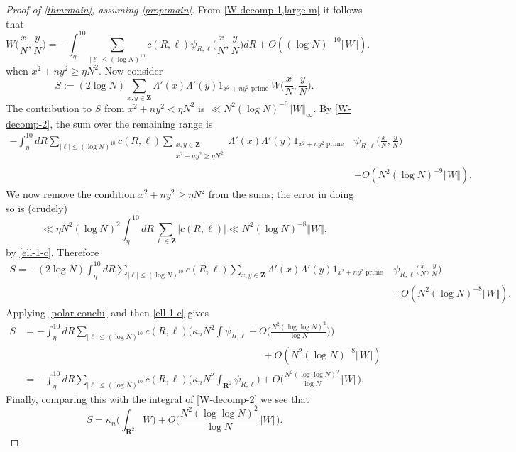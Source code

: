 \documentclass[11pt,reqno]{amsart}
\numberwithin{equation}{section}
\theoremstyle{definition}
\theoremstyle{remark}
\renewcommand{\le}{\leqslant}
\renewcommand{\ge}{\geqslant}
\newcommand\Z{\mathbf{Z}}
\newcommand\R{\mathbf{R}}
\begin{document}
\begin{proof}[Proof of \cref{thm:main}, assuming \cref{prop:main}]
From \cref{W-decomp-1,large-m} it follows that
\begin{equation}\label{W-decomp-2} W\Big(\frac{x}{N}, \frac{y}{N}\Big) = -\int^{10}_{\eta} \sum_{|\ell| \le (\log N)^{10}} c(R,\ell) \psi_{R,\ell}\Big(\frac{x}{N}, \frac{y}{N}\Big) dR + O((\log N)^{-10} \Vert  W \Vert). \end{equation}
when $x^2 + ny^2 \ge \eta N^2$. Now consider
\begin{equation}\label{S-def} S := (2\log N)\sum_{x, y \in \Z} \Lambda'(x) \Lambda'(y) 1_{x^2 + ny^2  \operatorname{prime}} W\Big(\frac{x}{N}, \frac{y}{N}\Big).\end{equation}
The contribution to $S$ from $x^2 + ny^2 < \eta N^2$ is $\ll N^2(\log N)^{-9}\Vert W \Vert_{\infty}$.
By \cref{W-decomp-2}, the sum over the remaining range is
\begin{align*} -\int^{10}_{\eta} dR \sum_{|\ell| \le (\log N)^{10}} c(R,\ell) \sum_{\substack{x,y \in \Z \\ x^2 + ny^2 \ge \eta N^2}} \Lambda'(x) \Lambda'(y)1_{x^2 + ny^2  \operatorname{prime}} & \psi_{R,\ell}\Big(\frac{x}{N}, \frac{y}{N}\Big) \\ & + O(N^2 (\log N)^{-9} \Vert W \Vert). \end{align*}
We now remove the condition $x^2 + ny^2 \ge \eta N^2$ from the sums; the error in doing so is (crudely)
\[ \ll \eta N^2 (\log N)^2 \int^{10}_{\eta} dR\sum_{\ell \in \Z} |c(R,\ell)| \ll N^2 (\log N)^{-8} \Vert W \Vert, \] by \cref{ell-1-c}. 
Therefore
\begin{align*} S = - (2 \log N)\int^{10}_{\eta} dR \sum_{|\ell| \le (\log N)^{10}} c(R,\ell) \sum_{x, y \in \Z}\Lambda'(x) \Lambda'(y)1_{x^2 + ny^2  \operatorname{prime}}&  \psi_{R,\ell}\Big(\frac{x}{N}, \frac{y}{N}\Big)\\ & + O(N^2 (\log N)^{-8} \Vert W \Vert). \end{align*}
Applying \cref{polar-conclu} and then \cref{ell-1-c} gives
\begin{align*} S & = - \int^{10}_{\eta} dR \sum_{|\ell| \le (\log N)^{10}} c(R,\ell) \bigg(\kappa_n N^2 \int \psi_{R,\ell} + O\bigg( \frac{N^2(\log\log N)^{2}}{\log N} \bigg) \bigg) \\ & \qquad\qquad\qquad\qquad\qquad\qquad\qquad\qquad\qquad\qquad\qquad\qquad + O(N^2 (\log N)^{-8} \Vert W \Vert) \\ &  = - \int^{10}_{\eta} dR \sum_{|\ell| \le (\log N)^{10}} c(R,\ell) \bigg(\kappa_n N^2 \int_{\R^2} \psi_{R,\ell}  \bigg) + O\bigg(\frac{N^2(\log\log N)^{2}}{\log N} \Vert W \Vert\bigg) . \end{align*}
Finally, comparing this with the integral of \cref{W-decomp-2} we see that
\begin{equation}\label{main-preliminary}  S = \kappa_n\bigg( \int_{\R^2} W \bigg) + O\bigg(\frac{N^2(\log\log N)^{2}}{\log N} \Vert  W \Vert\bigg)  .\end{equation}


\end{proof}
\end{document}
